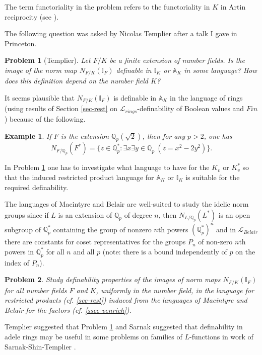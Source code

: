 \documentclass[12pt]{amsart}
\def\A{\mathbb{A}}
\def\I{\mathbb{I}}
\def \Qp {\mathbb{Q}_p}
\def\cL{\mathcal{L}}
\def\Q{\mathbb{Q}}
\def\cL{\mathcal{L}}
\newtheorem{ex}{Example}[section]
\numberwithin{equation}{section}
\newtheorem{prob}{Problem}[section]
\begin{document}
The term functoriality in the problem refers to the functoriality in $K$ in Artin reciprocity (see \cite{ramak}). 

The following question was asked by Nicolas Templier after a talk I gave in Princeton.
\begin{prob}[Templier]\label{prob-temp} Let $F/K$ be a finite extension of number fields. Is 
the image of the norm map $N_{F/K}(\I_F)$ definable in $\I_K$ or $\A_K$ in some language? How does this definition depend on the number field $K$?\end{prob}

It seems plausible that $N_{F/K}(\I_F)$ is definable in $\A_K$ in the language of rings (using results of 
Section \ref{sec-rest} on $\cL_{rings}$-definability of Boolean values and $Fin$) because of the following.

\begin{ex} If $F$ is the extension
$\Q_p(\sqrt{2})$, then for any $p>2$, one has 
$$N_{F/\Q_p}(F^*)=\{z\in \Q_p^*: \exists x \exists y \in \Q_p ~(z=x^2-2y^2)\}.$$\end{ex}

In Problem \ref{prob-temp} one has to investigate what language to have for the $K_v$ or $K_v^*$ so that the induced restricted product language for $\A_K$ or $\I_K$ is 
suitable for the required definability.

The languages of Macintyre and Belair are well-suited to study the idelic norm groups since if $L$ is an extension of $\Q_p$ of degree $n$, then $N_{L/\Qp}(L^*)$ is an open subgroup of $\Q_p^*$ containing the group of nonzero $n$th powers 
$(\Q_p^*)^n$ and in $\cL_{Belair}$ there are constants for coset representatives for the groups $P_n$ of non-zero $n$th powers in $\Q_p^*$ for all $n$ and all $p$ (note: there is a bound independently of $p$ on the index of $P_n$). 

\begin{prob}\label{prob-norm} Study definability properties of the images of norm maps $N_{F/K}(\I_F)$ for all number fields $F$ and $K$, 
uniformly in the number field, in the language for restricted products (cf. \ref{sec-rest}) induced from the languages of Macintyre and Belair for the factors (cf. \ref{ssec-venrich}). 
\end{prob}
Templier suggested that Problem \ref{prob-temp} and Sarnak suggested that definability in adele rings may be useful in some problems on families of $L$-functions in work of Sarnak-Shin-Templier \cite{peter-nicolas}. 
\end{document}
